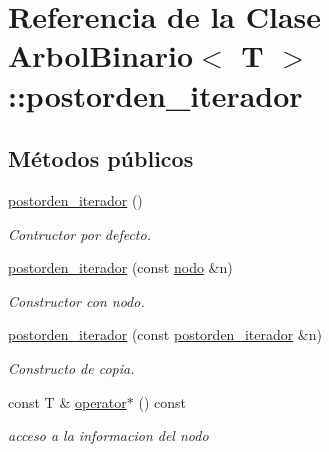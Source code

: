 \hypertarget{classArbolBinario_1_1postorden__iterador}{}\section{Referencia de la Clase Arbol\+Binario$<$ T $>$\+:\+:postorden\+\_\+iterador}
\label{classArbolBinario_1_1postorden__iterador}
\subsection*{Métodos públicos}
\begin{DoxyCompactItemize}
\item 
\mbox{\label{classArbolBinario_1_1postorden__iterador_a0c33704342f3b3dee5b3d21f2f2aa311}} 
\hyperlink{classArbolBinario_1_1postorden__iterador_a0c33704342f3b3dee5b3d21f2f2aa311}{postorden\+\_\+iterador} ()
\begin{DoxyCompactList}\small\item\em Contructor por defecto. \end{DoxyCompactList}\item 
\hyperlink{classArbolBinario_1_1postorden__iterador_a9eb37bb1b877b1c297889680055ace86}{postorden\+\_\+iterador} (const \hyperlink{classArbolBinario_1_1nodo}{nodo} \&n)
\begin{DoxyCompactList}\small\item\em Constructor con nodo. \end{DoxyCompactList}\item 
\hyperlink{classArbolBinario_1_1postorden__iterador_a083070e5bf8f1f4f5e73e11ae5129a64}{postorden\+\_\+iterador} (const \hyperlink{classArbolBinario_1_1postorden__iterador}{postorden\+\_\+iterador} \&n)
\begin{DoxyCompactList}\small\item\em Constructo de copia. \end{DoxyCompactList}\item 
\mbox{\label{classArbolBinario_1_1postorden__iterador_a7bda7ca81089b176089a32dd94013346}} 
const T \& \hyperlink{classArbolBinario_1_1postorden__iterador_a7bda7ca81089b176089a32dd94013346}{operator$\ast$} () const
\begin{DoxyCompactList}\small\item\em acceso a la informacion del nodo \end{DoxyCompactList}\item 

\end{DoxyCompactItemize}
